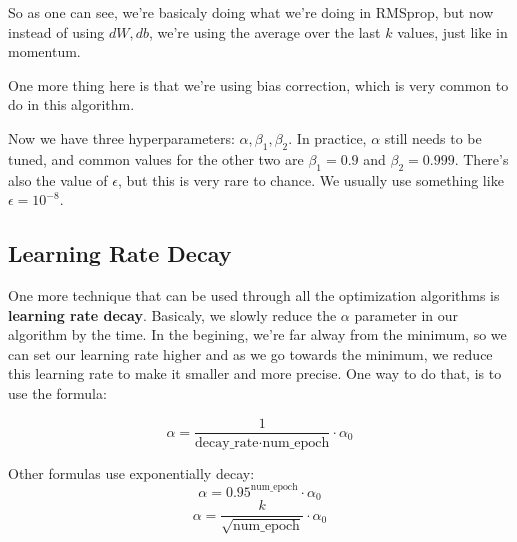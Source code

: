 \documentclass[12pt, a4paper, oneside]{book}
\begin{document}
So as one can see, we're basicaly doing what we're doing in RMSprop, but now
instead of using $dW,db$, we're using the average over the last $k$ values, just
like in momentum.

One more thing here is that we're using bias correction, which is very common to
do in this algorithm.

Now we have three hyperparameters: $\alpha,\beta_1,\beta_2$. In practice,
$\alpha$ still needs to be tuned, and common values for the other two are
$\beta_1=0.9$ and $\beta_2=0.999$. There's also the value of $\epsilon$, but
this is very rare to chance. We usually use something like $\epsilon=10^{-8}$.

\subsection{Learning Rate Decay}%
\label{sub:learning_rate_decay}

One more technique that can be used through all the optimization algorithms is
\textbf{learning rate decay}. Basicaly, we slowly reduce the $\alpha$ parameter
in our algorithm by the time. In the begining, we're far alway from the minimum,
so we can set our learning rate higher and as we go towards the minimum, we
reduce this learning rate to make it smaller and more precise. One way to do
that, is to use the formula:

\[
\alpha=\dfrac{1}{\text{decay\_rate}\cdot\text{num\_epoch}}\cdot\alpha_0
\]

Other formulas use exponentially decay:
\[
\alpha=0.95^{\text{num\_epoch}}\cdot\alpha_0
\]
\[
\alpha=\dfrac{k}{\sqrt{\text{num\_epoch}}}\cdot\alpha_0
\]

\end{document}
